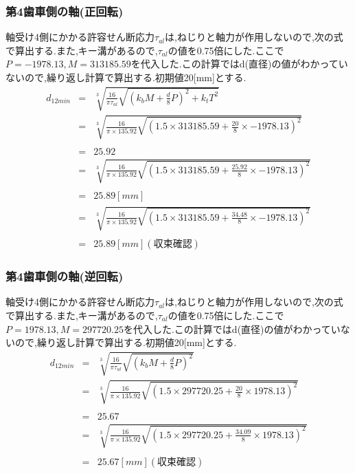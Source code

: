 \documentclass[a4j,twoside,openright,11pt]{jreport}
\begin{document}
\subsubsection{第4歯車側の軸(正回転)}
軸受け4側にかかる許容せん断応力$\tau_{al}$は,ねじりと軸力が作用しないので,次の式で算出する.また,キー溝があるので,$\tau_{al}$の値を0.75倍にした.ここで$P=-1978.13,M=313185.59$を代入した.この計算ではd(直径)の値がわかっていないので,繰り返し計算で算出する.初期値20[mm]とする.
\begin{eqnarray}
d_{12min}&=& \sqrt [3]{ \frac{16}{\pi \tau_{al}}\sqrt{(k_bM+\frac{d}{8}P)^2+k_tT^2} }\\
       &=& \sqrt [3]{ \frac{16}{\pi \times 135.92} \sqrt{(1.5 \times 313185.59 +\frac{20}{8}\times -1978.13)^2}}\nonumber\\
\\
       &=&25.92\\
       &=& \sqrt [3]{ \frac{16}{\pi \times 135.92} \sqrt{(1.5 \times 313185.59 +\frac{25.92}{8}\times -1978.13)^2} }\nonumber\\
\\
         &=& 25.89[mm]\\
       &=& \sqrt [3]{ \frac{16}{\pi \times 135.92} \sqrt{(1.5 \times 313185.59 +\frac{34.48}{8}\times -1978.13)^2} }\nonumber\\
\\
         &=& 25.89[mm](収束確認)
\end{eqnarray}
\subsubsection{第4歯車側の軸(逆回転)}
軸受け4側にかかる許容せん断応力$\tau_{al}$は,ねじりと軸力が作用しないので,次の式で算出する.また,キー溝があるので,$\tau_{al}$の値を0.75倍にした.ここで$P=1978.13,M=297720.25$を代入した.この計算ではd(直径)の値がわかっていないので,繰り返し計算で算出する.初期値20[mm]とする.
\begin{eqnarray}
d_{12min}&=& \sqrt [3]{ \frac{16}{\pi \tau_{al}}\sqrt{(k_bM+\frac{d}{8}P)^2} }\\
       &=& \sqrt [3]{ \frac{16}{\pi \times 135.92} \sqrt{(1.5 \times 297720.25 +\frac{20}{8}\times 1978.13)^2}}\nonumber\\
\\
       &=& 25.67\\
       &=& \sqrt [3]{ \frac{16}{\pi  \times 135.92} \sqrt{(1.5 \times 297720.25 +\frac{34.09}{8}\times 1978.13)^2}}\nonumber\\
\\
         &=& 25.67[mm](収束確認)
\end{eqnarray}
\end{document}
